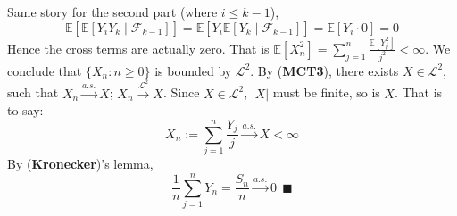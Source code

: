 \documentclass[a4paper,12pt,twoside]{book}
\begin{document}
\begin{itemize}
\begin{itemize}
	Same story for the second part (where $i\leq k-1$),
	\begin{equation}
		\mathbb{E}\left[\mathbb{E}\left[Y_iY_k\middle|\mathcal{F}_{k-1}\right]\right]=\mathbb{E}\left[Y_i\mathbb{E}\left[Y_k\middle|\mathcal{F}_{k-1}\right]\right]=\mathbb{E}\left[Y_i \cdot 0\right]=0
	\end{equation}
	Hence the cross terms are actually zero. That is $\mathbb{E}\left[X_n^2\right]=\sum_{j=1}^n \frac{\mathbb{E}\left[Y_j^2\right]}{j^2}<\infty$. We conclude that $\{X_n: n\geq 0\}$ is bounded by $\mathcal{L}^2$. \newline
	By (\textbf{MCT3}), there exists $X\in \mathcal{L}^2$, such that $X_n \xrightarrow{a.s.} X$; $X_n \xrightarrow{\mathcal{L}^2} X$. Since $X\in \mathcal{L}^2$, $|X|$ must be finite, so is $X$. That is to say:
	\begin{equation}
		X_n := \sum_{j=1}^n\frac{Y_j}{j} \xrightarrow{a.s.} X < \infty
	\end{equation}
	By (\textbf{Kronecker})'s lemma,
	\begin{equation}
		\frac{1}{n}\sum_{j=1}^n Y_n = \frac{S_n}{n} \xrightarrow{a.s.} 0~~\blacksquare
	\end{equation}

\end{itemize}


\end{itemize}
\end{document}
